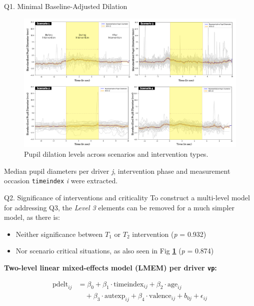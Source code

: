 \documentclass[final]{beamer}
\newlength{\colwidth}
\begin{document}
\begin{frame}[t]
\begin{columns}[t]
\begin{column}{\colwidth}
\begin{block}{Q1. Minimal Baseline-Adjusted Dilation}
    \begin{figure}
      \centering
      \includegraphics[width=0.95\linewidth]{images/fig1.pdf}
      \caption{Pupil dilation levels across scenarios and intervention types.}
      \label{fig:jaja}
    \end{figure}
 Median pupil diameters per driver \emph{j}, intervention phase and measurement occasion \texttt{timeindex} \emph{i} were extracted.
 
  \end{block}

  \begin{block}{Q2. Significance of interventions and criticality}
    To construct a multi-level model for addressing Q3, the \textit{Level 3} elements can be removed for a much simpler model, as there is:
    \begin{itemize}
        \item Neither significance between $T_1$ or $T_2$ intervention (\emph{p} = 0.932)
        \item Nor scenario critical situations, as also seen in Fig \textbf{\ref{fig:jaja}} (\emph{p} = 0.874)
    \end{itemize}

\begin{center}
    \textbf{\textcolor{utred}{Two-level linear mixed-effects model (LMEM) per driver \texttt{vp}:}}
\end{center}

\vspace{-0.4cm} %

\begin{tcolorbox}[colback=gray!10, colframe=gray!50, sharp corners, boxrule=0.5pt, left=3pt, right=3pt, top=1pt, bottom=3pt, arc=0mm]
    \begin{align}
        \text{pdelt}_{ij} &= \beta_{0} + \beta_{1} \cdot \text{timeindex}_{ij} + \beta_{2} \cdot \text{age}_{ij} \nonumber \\
        &\quad + \beta_{3} \cdot \text{autexp}_{ij} + \beta_{4} \cdot \text{valence}_{ij} + b_{0j} + \epsilon_{ij}
    \end{align}
\end{tcolorbox}


\end{block}
\end{column}
\end{columns}
\end{frame}
\end{document}
